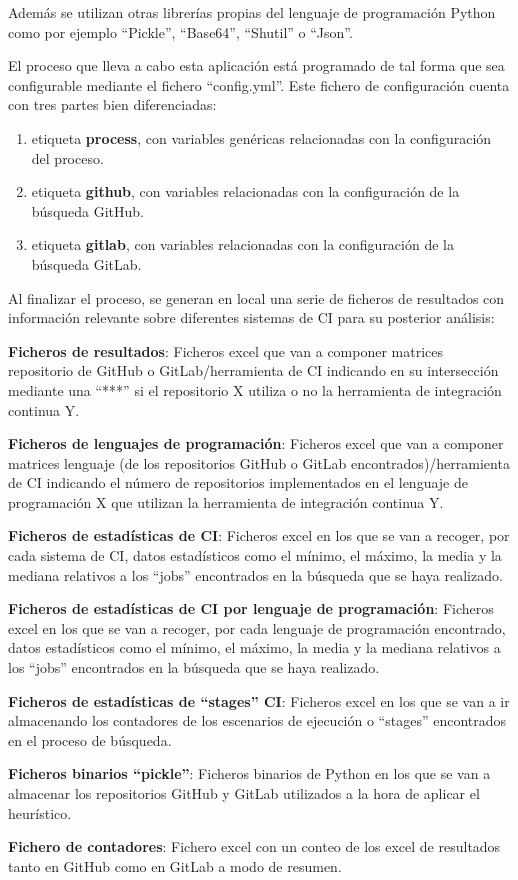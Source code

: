 Además se utilizan otras librerías propias del lenguaje de programación Python como por ejemplo ``Pickle'', ``Base64'', ``Shutil'' o ``Json''.

El proceso que lleva a cabo esta aplicación está programado de tal forma que sea configurable mediante el fichero ``config.yml''. Este fichero de configuración cuenta con tres partes bien diferenciadas:

\begin{enumerate}
    \item etiqueta \textbf{process}, con variables genéricas relacionadas con la configuración del proceso.
    \item etiqueta \textbf{github}, con variables relacionadas con la configuración de la búsqueda GitHub.
    \item etiqueta \textbf{gitlab}, con variables relacionadas con la configuración de la búsqueda GitLab.
\end{enumerate}

Al finalizar el proceso, se generan en local una serie de ficheros de resultados con información relevante sobre diferentes sistemas de CI para su posterior análisis:

\begin{compactitem}
    \item \textbf{Ficheros de resultados}: Ficheros excel que van a componer matrices repositorio de GitHub o GitLab/herramienta de CI indicando en su intersección mediante una ``***'' si el repositorio X utiliza o no la herramienta de integración continua Y.
    \item \textbf{Ficheros de lenguajes de programación}: Ficheros excel que van a componer matrices lenguaje (de los repositorios GitHub o GitLab encontrados)/herramienta de CI indicando el número de repositorios implementados en el lenguaje de programación X que utilizan la herramienta de integración continua Y.
    \item \textbf{Ficheros de estadísticas de CI}: Ficheros excel en los que se van a recoger, por cada sistema de CI, datos estadísticos como el mínimo, el máximo, la media y la mediana relativos a los ``jobs'' encontrados en la búsqueda que se haya realizado.
    \item \textbf{Ficheros de estadísticas de CI por lenguaje de programación}: Ficheros excel en los que se van a recoger, por cada lenguaje de programación encontrado, datos estadísticos como el mínimo, el máximo, la media y la mediana relativos a los ``jobs'' encontrados en la búsqueda que se haya realizado.
    \item \textbf{Ficheros de estadísticas de ``stages'' CI}: Ficheros excel en los que se van a ir almacenando los contadores de los escenarios de ejecución o ``stages'' encontrados en el proceso de búsqueda.
    \item \textbf{Ficheros binarios ``pickle''}: Ficheros binarios de Python en los que se van a almacenar los repositorios GitHub y GitLab utilizados a la hora de aplicar el heurístico.
    \item \textbf{Fichero de contadores}: Fichero excel con un conteo de los excel de resultados tanto en GitHub como en GitLab a modo de resumen.
\end{compactitem}

